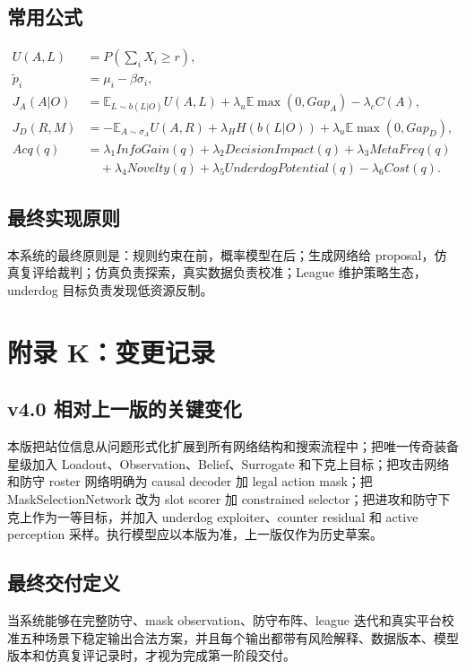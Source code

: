 \documentclass[UTF8,12pt,openany]{ctexbook}
\newcommand{\E}{\mathbb{E}}
\begin{document}
\section{常用公式}
\begin{align}
U(A,L)&=P\left(\sum_iX_i\ge r\right),\\
\tilde p_i&=\mu_i-\beta\sigma_i,\\
J_A(A|O)&=\E_{L\sim b(L|O)}U(A,L)+\lambda_u\E\max(0,Gap_A)-\lambda_cC(A),\\
J_D(R,M)&=-\E_{A\sim\sigma_A}U(A,R)+\lambda_HH(b(L|O))+\lambda_u\E\max(0,Gap_D),\\
Acq(q)&=\lambda_1InfoGain(q)+\lambda_2DecisionImpact(q)+\lambda_3MetaFreq(q)\\
&\quad+\lambda_4Novelty(q)+\lambda_5UnderdogPotential(q)-\lambda_6Cost(q).
\end{align}

\section{最终实现原则}
本系统的最终原则是：规则约束在前，概率模型在后；生成网络给 proposal，仿真复评给裁判；仿真负责探索，真实数据负责校准；League 维护策略生态，underdog 目标负责发现低资源反制。


\chapter{附录 K：变更记录}
\section{v4.0 相对上一版的关键变化}
本版把站位信息从问题形式化扩展到所有网络结构和搜索流程中；把唯一传奇装备星级加入 Loadout、Observation、Belief、Surrogate 和下克上目标；把攻击网络和防守 roster 网络明确为 causal decoder 加 legal action mask；把 MaskSelectionNetwork 改为 slot scorer 加 constrained selector；把进攻和防守下克上作为一等目标，并加入 underdog exploiter、counter residual 和 active perception 采样。执行模型应以本版为准，上一版仅作为历史草案。

\section{最终交付定义}
当系统能够在完整防守、mask observation、防守布阵、league 迭代和真实平台校准五种场景下稳定输出合法方案，并且每个输出都带有风险解释、数据版本、模型版本和仿真复评记录时，才视为完成第一阶段交付。
\end{document}
